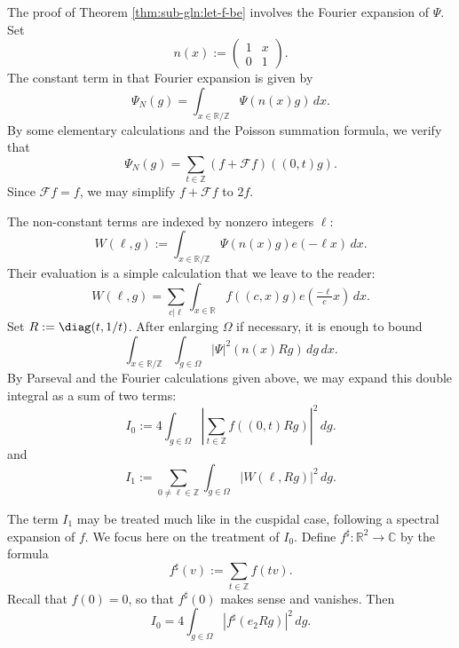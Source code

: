 The proof of Theorem \ref{thm:sub-gln:let-f-be} involves the Fourier expansion of $\Psi$.  Set
\begin{equation*}
  n(x) := \begin{pmatrix}
    1 & x \\
    0 & 1
  \end{pmatrix}.
\end{equation*}
The constant term in that Fourier expansion is given by
\begin{equation*}
  \Psi_N(g) = \int_{x \in \mathbb{R} / \mathbb{Z} } \Psi(n(x) g) \, d x.
\end{equation*}
By some elementary calculations and the Poisson summation formula, we verify that
\begin{equation*}
  \Psi_N(g) = \sum_{t \in \mathbb{Z} } (f + \mathcal{F} f ) ((0,t) g).
\end{equation*}
Since $\mathcal{F}f = f$, we may simplify $f + \mathcal{F} f$ to $2 f$.

The non-constant terms are indexed by nonzero integers $\ell$:
\begin{equation*}
  W(\ell,g) := \int_{x \in \mathbb{R} / \mathbb{Z} } \Psi(n(x) g) e(-\ell x) \, d x.
\end{equation*}
Their evaluation is a simple calculation that we leave to the reader:
\begin{equation}\label{eq:well-g-=}
  W(\ell, g)
  = \sum_{c | \ell} \int_{x \in \mathbb{R} } f((c, x) g) e( \tfrac{- \ell}{c} x) \, d x.
\end{equation}
Set $R := \diag(t,1/t)$.  After enlarging $\Omega$ if necessary, it is enough to bound
\begin{equation*}
  \int_{x \in  \mathbb{R} / \mathbb{Z} }
  \int_{g \in \Omega }
  |\Psi|^2(n(x) R g) \, d g \, d x.
\end{equation*}
By Parseval and the Fourier calculations given above, we may expand this double integral as a sum of two terms:
\begin{equation*}
  I_0 := 4 \int_{g \in \Omega } \left\lvert \sum_{t \in \mathbb{Z} } f((0,t) R g) \right\rvert^2 \, d g.
\end{equation*}
and
\begin{equation*}
  I_1 := \sum_{0 \neq \ell \in \mathbb{Z}}
  \int_{g \in \Omega }
  |W(\ell, R g)|^2 \, d g.
\end{equation*}

The term $I_1$ may be treated much like in the cuspidal case, following a spectral expansion of $f$.  We focus here on the treatment of $I_0$.  Define $f^\sharp : \mathbb{R}^2 \rightarrow \mathbb{C}$ by the formula
\begin{equation*}
  f^\sharp(v)  := \sum_{t \in \mathbb{Z} } f(t v).
\end{equation*}
Recall that $f(0) = 0$, so that $f^\sharp (0)$ makes sense and vanishes.  Then
\begin{equation*}
  I_0 = 4 \int_{g \in \Omega } | f^\sharp(e_2 R g)|^2 \, d g.
\end{equation*}

